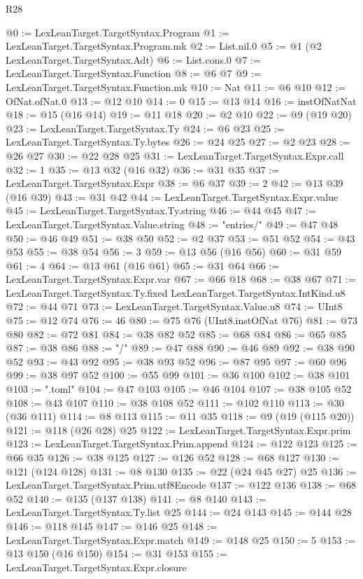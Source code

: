\begin{lexlean}{R28}
\begin{coremodule}
@0 := LexLeanTarget.TargetSyntax.Program
@1 := LexLeanTarget.TargetSyntax.Program.mk
@2 := List.nil.{0}
@5 := @1 (@2 LexLeanTarget.TargetSyntax.Adt)
@6 := List.cons.{0}
@7 := LexLeanTarget.TargetSyntax.Function
@8 := @6 @7
@9 := LexLeanTarget.TargetSyntax.Function.mk
@10 := Nat
@11 := @6 @10
@12 := OfNat.ofNat.{0}
@13 := @12 @10
@14 := 0
@15 := @13 @14
@16 := instOfNatNat
@18 := @15 (@16 @14)
@19 := @11 @18
@20 := @2 @10
@22 := @9 (@19 @20)
@23 := LexLeanTarget.TargetSyntax.Ty
@24 := @6 @23
@25 := LexLeanTarget.TargetSyntax.Ty.bytes
@26 := @24 @25
@27 := @2 @23
@28 := @26 @27
@30 := @22 @28 @25
@31 := LexLeanTarget.TargetSyntax.Expr.call
@32 := 1
@35 := @13 @32 (@16 @32)
@36 := @31 @35
@37 := LexLeanTarget.TargetSyntax.Expr
@38 := @6 @37
@39 := 2
@42 := @13 @39 (@16 @39)
@43 := @31 @42
@44 := LexLeanTarget.TargetSyntax.Expr.value
@45 := LexLeanTarget.TargetSyntax.Ty.string
@46 := @44 @45
@47 := LexLeanTarget.TargetSyntax.Value.string
@48 := "entries/"
@49 := @47 @48
@50 := @46 @49
@51 := @38 @50
@52 := @2 @37
@53 := @51 @52
@54 := @43 @53
@55 := @38 @54
@56 := 3
@59 := @13 @56 (@16 @56)
@60 := @31 @59
@61 := 4
@64 := @13 @61 (@16 @61)
@65 := @31 @64
@66 := LexLeanTarget.TargetSyntax.Expr.var
@67 := @66 @18
@68 := @38 @67
@71 := LexLeanTarget.TargetSyntax.Ty.fixed LexLeanTarget.TargetSyntax.IntKind.u8
@72 := @44 @71
@73 := LexLeanTarget.TargetSyntax.Value.u8
@74 := UInt8
@75 := @12 @74
@76 := 46
@80 := @75 @76 (UInt8.instOfNat @76)
@81 := @73 @80
@82 := @72 @81
@84 := @38 @82 @52
@85 := @68 @84
@86 := @65 @85
@87 := @38 @86
@88 := "/"
@89 := @47 @88
@90 := @46 @89
@92 := @38 @90 @52
@93 := @43 @92
@95 := @38 @93 @52
@96 := @87 @95
@97 := @60 @96
@99 := @38 @97 @52
@100 := @55 @99
@101 := @36 @100
@102 := @38 @101
@103 := ".toml"
@104 := @47 @103
@105 := @46 @104
@107 := @38 @105 @52
@108 := @43 @107
@110 := @38 @108 @52
@111 := @102 @110
@113 := @30 (@36 @111)
@114 := @8 @113
@115 := @11 @35
@118 := @9 (@19 (@115 @20))
@121 := @118 (@26 @28) @25
@122 := LexLeanTarget.TargetSyntax.Expr.prim
@123 := LexLeanTarget.TargetSyntax.Prim.append
@124 := @122 @123
@125 := @66 @35
@126 := @38 @125
@127 := @126 @52
@128 := @68 @127
@130 := @121 (@124 @128)
@131 := @8 @130
@135 := @22 (@24 @45 @27) @25
@136 := LexLeanTarget.TargetSyntax.Prim.utf8Encode
@137 := @122 @136
@138 := @68 @52
@140 := @135 (@137 @138)
@141 := @8 @140
@143 := LexLeanTarget.TargetSyntax.Ty.list @25
@144 := @24 @143
@145 := @144 @28
@146 := @118 @145
@147 := @146 @25
@148 := LexLeanTarget.TargetSyntax.Expr.match
@149 := @148 @25
@150 := 5
@153 := @13 @150 (@16 @150)
@154 := @31 @153
@155 := LexLeanTarget.TargetSyntax.Expr.closure

\end{coremodule}
\end{lexlean}
